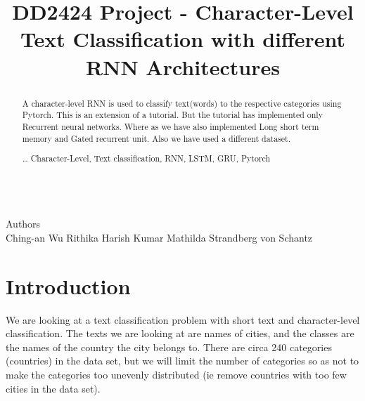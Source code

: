 \documentclass[runningheads]{llncs}
\begin{document}
\pagestyle{headings}
\mainmatter
\def\ECCV16SubNumber{***}
\title{DD2424 Project - Character-Level Text Classification with different RNN Architectures}
\\Authors\\
Ching-an Wu 
Rithika Harish Kumar 
Mathilda Strandberg von Schantz

\maketitle


\begin{abstract}

A character-level RNN is used to classify text(words) to the respective categories using Pytorch. This is an extension of a tutorial\cite{maintutorial}. But the tutorial has implemented only Recurrent neural networks. Where as we have also implemented Long short term memory and Gated recurrent unit. Also we have used a different dataset.   

\dots
{}
Character-Level, Text classification, RNN, LSTM, GRU, Pytorch 
\end{abstract}


\section{Introduction}


We are looking at a text classification problem with short text and character-level classification. The texts we are looking at are names of cities, and the classes are the names of the country the city belongs to. There are circa 240 categories (countries) in the data set, but we will limit the number of categories so as not to make the categories too unevenly distributed (ie remove countries with too few cities in the data set).
\end{document}
